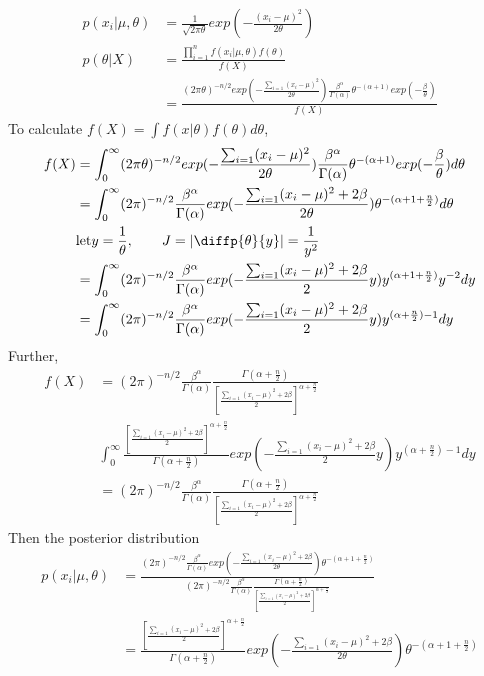 \begin{itemize}
	\begin{align*}
		p(x_i|\mu, \theta) &= \frac{1}{\sqrt{2 \pi \theta}} exp(- \frac{(x_i-\mu)^2}{2 \theta} )\\
		p(\theta|X) &= \frac{\prod_{i=1}^n f(x_i| \mu, \theta) f(\theta)}{f(X)} \\
		&= \frac{ (2\pi \theta)^{-n/2} exp(-\frac{\sum_{i=1} (x_i-\mu)^2}{2\theta}) \frac{\beta^{\alpha}}{\Gamma(\alpha)} \theta^{-(\alpha + 1)} exp(-\frac{\beta}{\theta}) }{f(X)} 
	\end{align*} 
To calculate $f(X)= \int f(x|\theta) f(\theta) d \theta$,
\begin{align*}
	f(X)&=  \int_{0}^{\infty} (2\pi \theta)^{-n/2} exp(-\frac{\sum_{i=1} (x_i-\mu)^2}{2\theta}) \frac{\beta^{\alpha}}{\Gamma(\alpha)} \theta^{-(\alpha + 1)} exp(-\frac{\beta}{\theta}) d \theta \\	
	&= \int_{0}^{\infty} (2\pi )^{-n/2} \frac{\beta^{\alpha}}{\Gamma(\alpha)}  exp(-\frac{\sum_{i=1} (x_i-\mu)^2 + 2 \beta}{2\theta}) \theta^{-(\alpha + 1 + \frac{n}{2})}  d \theta \\	
	& \text{let} y= \frac{1}{\theta}, \qquad J=|\diffp{\theta}{y}| = \frac{1}{y^2} \\
	&= \int_{0}^{\infty} (2\pi )^{-n/2} \frac{\beta^{\alpha}}{\Gamma(\alpha)}  exp(-\frac{\sum_{i=1} (x_i-\mu)^2 + 2 \beta}{2} y) y^{(\alpha + 1 + \frac{n}{2})} y^{-2} d y \\	
	&= \int_{0}^{\infty} (2\pi )^{-n/2} \frac{\beta^{\alpha}}{\Gamma(\alpha)}  exp(-\frac{\sum_{i=1} (x_i-\mu)^2 + 2 \beta}{2} y) y^{(\alpha + \frac{n}{2})-1}  d y 
\end{align*} 
Further,
\begin{align*}
	f(X) &= (2\pi )^{-n/2}  \frac{\beta^{\alpha}}{\Gamma(\alpha)} \frac{\Gamma(\alpha + \frac{n}{2})}{[\frac{\sum_{i=1} (x_i-\mu)^2 + 2 \beta}{2}]^{\alpha + \frac{n}{2}}}\\
	& \int_{0}^{\infty} \frac{[\frac{\sum_{i=1} (x_i-\mu)^2 + 2 \beta}{2}]^{\alpha + \frac{n}{2}}}{\Gamma(\alpha + \frac{n}{2})} exp(-\frac{\sum_{i=1} (x_i-\mu)^2 + 2 \beta}{2} y) y^{(\alpha + \frac{n}{2})-1}  d y \\	
	&=  (2\pi )^{-n/2}  \frac{\beta^{\alpha}}{\Gamma(\alpha)} \frac{\Gamma(\alpha + \frac{n}{2})}{[\frac{\sum_{i=1} (x_i-\mu)^2 + 2 \beta}{2}]^{\alpha + \frac{n}{2}}}
\end{align*}
Then the posterior distribution
\begin{align*}
	p(x_i|\mu, \theta) &=  \frac{ (2\pi )^{-n/2} \frac{\beta^{\alpha}}{\Gamma(\alpha)}  exp(-\frac{\sum_{i=1} (x_i-\mu)^2 + 2 \beta}{2\theta}) \theta^{-(\alpha + 1 + \frac{n}{2})}   }{(2\pi )^{-n/2}  \frac{\beta^{\alpha}}{\Gamma(\alpha)} \frac{\Gamma(\alpha + \frac{n}{2})}{[\frac{\sum_{i=1} (x_i-\mu)^2 + 2 \beta}{2}]^{\alpha + \frac{n}{2}}}} \\
	&= \frac{[\frac{\sum_{i=1} (x_i-\mu)^2 + 2 \beta}{2}]^{\alpha + \frac{n}{2}}}{\Gamma(\alpha + \frac{n}{2})} exp(-\frac{\sum_{i=1} (x_i-\mu)^2 + 2 \beta}{2\theta}) \theta^{-(\alpha + 1 + \frac{n}{2})}
\end{align*} 


\end{itemize}
